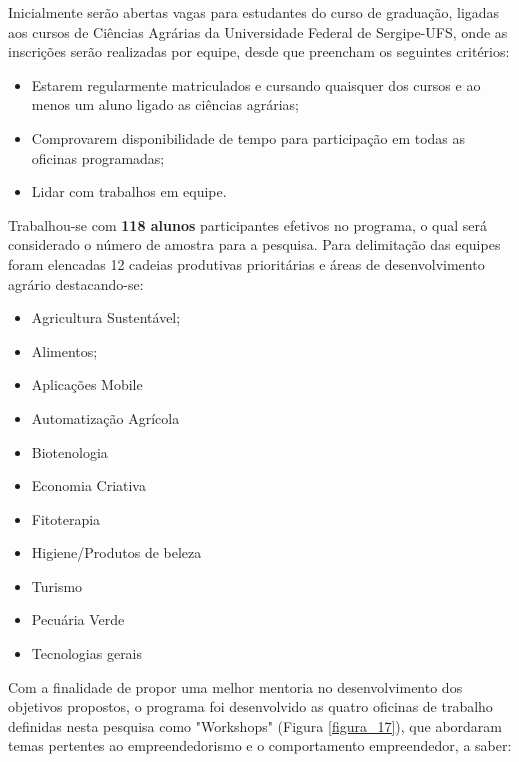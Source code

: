 Inicialmente serão abertas vagas para estudantes do curso de graduação, ligadas aos cursos de Ciências Agrárias da Universidade Federal de Sergipe-UFS, onde as inscrições serão realizadas por equipe, desde que preencham os seguintes critérios:

	
\begin{itemize}
\item{Estarem regularmente matriculados e cursando quaisquer dos cursos e ao menos um aluno ligado as ciências agrárias;}
\item{Comprovarem disponibilidade de tempo para participação em todas as oficinas programadas;}
\item{Lidar com trabalhos em equipe.}
\end{itemize}

Trabalhou-se com \textbf{118 alunos} participantes efetivos no programa, o qual será considerado o número de amostra para a pesquisa. Para delimitação das equipes foram elencadas 12 cadeias produtivas  prioritárias e áreas de desenvolvimento agrário destacando-se:

\begin{multicols}{2}
\centering
    \begin{itemize}
    \item{Agricultura Sustentável;}
    \item{Alimentos;}
    \item{Aplicações Mobile}
    \item{Automatização Agrícola}
    \item{Biotenologia}
    \item{Economia Criativa}
    \item{Fitoterapia}
    \item{Higiene/Produtos de beleza}
    \item{Turismo}
    \item{Pecuária Verde}
    \item{Tecnologias gerais}
\end{itemize}
\end{multicols}



Com a finalidade de propor uma melhor mentoria no desenvolvimento dos objetivos propostos, o programa foi desenvolvido as quatro oficinas de trabalho definidas nesta pesquisa como  "Workshops" (Figura \ref{figura_17}), que abordaram temas pertentes ao empreendedorismo e o comportamento empreendedor, a saber:

